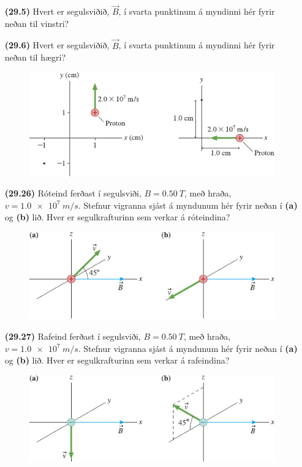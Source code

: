 \ifdefined \wholebook \else\documentclass[oneside]{book}\usepackage{EdlBook}\graphicspath{{figures/}}
\begin{document}
\begin{enumerate}[label = \textbf{(\alph*)}]

\item[\textbf{(29.5)}] Hvert er segulsviðið, $\vec{B}$, í svarta punktinum á myndinni hér fyrir neðan til vinstri?

\item[\textbf{(29.6)}] Hvert er segulsviðið, $\vec{B}$, í svarta punktinum á myndinni hér fyrir neðan til hægri?

\begin{figure}[H]
    \centering
    \includegraphics{figures/rk2904.pdf}
\end{figure}

\item[\textbf{(29.26)}] Róteind ferðast í segulsviði, $B = \SI{0.50}{T}$, með hraða, $v = \SI{1.0e7}{m/s}$. Stefnur vigranna sjást á myndunum hér fyrir neðan í \textbf{(a)} og \textbf{(b)} lið. Hver er segulkrafturinn sem verkar á róteindina?

\begin{figure}[H]
    \centering
    \includegraphics{figures/rk2927.pdf}
\end{figure}

\item[\textbf{(29.27)}] Rafeind ferðast í segulsviði, $B = \SI{0.50}{T}$, með hraða, $v = \SI{1.0e7}{m/s}$. Stefnur vigranna sjást á myndunum hér fyrir neðan í \textbf{(a)} og \textbf{(b)} lið. Hver er segulkrafturinn sem verkar á rafeindina?

\begin{figure}[H]
    \centering
    \includegraphics{figures/rk2926.pdf}
\end{figure}


\end{enumerate}
\end{document}
